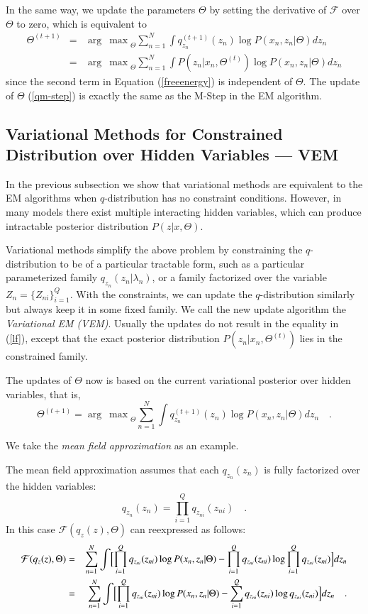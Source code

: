 \documentclass{article}
\begin{document}
In the same way, we update the parameters $\Theta$ by setting the derivative of $\mathcal{F}$
over $\Theta$ to zero, which is equivalent to
\begin{eqnarray}
\Theta^{(t+1)}
&=& {\arg\ \max}_{\Theta} \sum^N_{n=1}\int q_{z_n}^{(t+1)}(z_n)\log P(x_n,z_n|\Theta)dz_n \\
&=& {\arg\ \max}_{\Theta} \sum^N_{n=1}\int P(z_n|x_n, \Theta^{(t)}) \log P(x_n,z_n|\Theta)dz_n \label{qm-step}
\end{eqnarray}
since the second term in Equation (\ref{freeenergy}) is independent of $\Theta$.
The update of $\Theta$ (\ref{qm-step}) is exactly the same as the M-Step in the EM algorithm.

\subsection{Variational Methods for Constrained Distribution over Hidden Variables --- VEM}
In the previous subsection we show that variational methods are equivalent to the EM algorithms when
$q$-distribution has no constraint conditions.
However, in many models there exist multiple interacting hidden variables,
which can produce intractable posterior distribution $P(z|x, \Theta)$.

Variational methods simplify the above problem by constraining the $q$-distribution
to be of a particular tractable form,
such as a particular parameterized family $q_{z_n}(z_n|\lambda_n)$,
or a family factorized over the variable $Z_n=\{Z_{ni}\}^Q_{i=1}$.
With the constraints, we can update the $q$-distribution similarly but always keep it in some fixed family.
We call the new update algorithm the \textit{Variational EM (VEM)}.
Usually the updates do not result in the equality in (\ref{lf}),
except that the exact posterior distribution $P(z_n|x_n, \Theta^{(t)})$ lies in the constrained family.

The updates of $\Theta$ now is based on the current variational posterior over hidden variables,
that is,
\begin{equation}
\Theta^{(t+1)} = {\arg\ \max}_{\Theta} \sum^N_{n=1}\int q_{z_n}^{(t+1)}(z_n)\log P(x_n,z_n|\Theta)dz_n \quad .
\end{equation}

We take the \textit{mean field approximation} as an example.

The mean field approximation assumes that each $q_{z_n}(z_n)$ is fully factorized
over the hidden variables:
\begin{equation}
q_{z_n}(z_n) = \prod^Q_{i=1} q_{z_{ni}}(z_{ni}) \quad .
\end{equation}
In this case $\mathcal{F}(q_z(z),\Theta)$ can reexpressed as follows:
\begin{eqnarray}
\mathcal{F}(q_z(z),\Theta)
&=& \sum^N_{n=1}\int\Bigl[ \prod^Q_{i=1} q_{z_{ni}}(z_{ni})\log P(x_n,z_n|\Theta)-
\prod^Q_{i=1} q_{z_{ni}}(z_{ni})\log \prod^Q_{i=1} q_{z_{ni}}(z_{ni})\Bigr]dz_n \\
&=& \sum^N_{n=1}\int\Bigl[ \prod^Q_{i=1} q_{z_{ni}}(z_{ni})\log P(x_n,z_n|\Theta)-
\sum^Q_{i=1} q_{z_{ni}}(z_{ni})\log q_{z_{ni}}(z_{ni})\Bigr]dz_n \quad .
\end{eqnarray}
\end{document}
